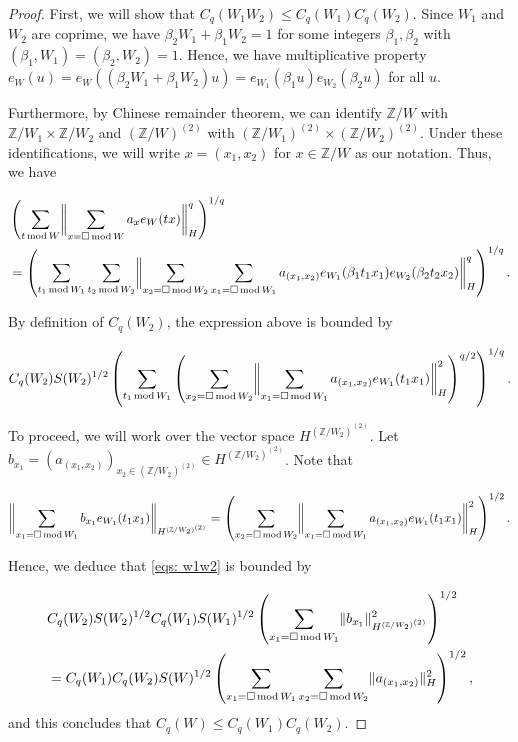 \documentclass[11pt]{amsart}
\theoremstyle{plain} %
\theoremstyle{remark}
\numberwithin{equation}{section}
\newcommand{\Z}{\mathbb{Z}}
\DeclarePairedDelimiter\norm{\lVert}{\rVert}
\newcommand{\sqw}[1]{\sum_{#1=\square\,\mathrm{mod}\,W}}
\newcommand{\sqwone}[1]{\sum_{#1=\square\,\mathrm{mod}\,W_1}}
\newcommand{\sqwtwo}[1]{\sum_{#1=\square\,\mathrm{mod}\,W_2}}
\newcommand{\aw}[1]{\sum_{#1\,\mathrm{mod}\,W}}
\newcommand{\awone}[1]{\sum_{#1\,\mathrm{mod}\,W_1}}
\newcommand{\awtwo}[1]{\sum_{#1\,\mathrm{mod}\,W_2}}
\begin{document}
\begin{proof}
    First, we will show that $C_q(W_1W_2)\leq C_q(W_1)C_q(W_2)$. Since $W_1$ and $W_2$ are coprime, we have $\beta_2 W_1+\beta_1 W_2=1$ for some integers $\beta_1,\beta_2$ with $(\beta_1,W_1)=(\beta_2,W_2)=1$. Hence, we have multiplicative property $e_W(u)=e_W((\beta_2 W_1+\beta_1 W_2)u)=e_{W_1}(\beta_1 u)e_{W_2}(\beta_2 u)$ for all $u$. 
    
    Furthermore, by Chinese remainder theorem, we can identify $\Z/W$ with $\Z/W_1\times\Z/W_2$ and $(\Z/W)^{(2)}$ with $(\Z/W_1)^{(2)}\times(\Z/W_2)^{(2)}$. Under these identifications, we will write $x=(x_1,x_2)$ for $x\in \Z/W$ as our notation. Thus, we have

    \begin{align*}
        &\left(\aw{t}\norm[\bigg]{\sqw{x}a_x e_W(tx)}^q_H\right)^{1/q}\\
        &=\left(\awone{t_1}\awtwo{t_2}\norm[\bigg]{\sqwtwo{x_2}\sqwone{x_1}a_{(x_1,x_2)} e_{W_1}(\beta_1 t_1 x_1)e_{W_2}(\beta_2 t_2 x_2)}^q_H\right)^{1/q}.
    \end{align*}

    By definition of $C_q(W_2)$, the expression above is bounded by

    \begin{equation}\label{eqs: w1w2}
        C_q(W_2)S(W_2)^{1/2}\left(\awone{t_1}\left(\sqwtwo{x_2}\norm[\bigg]{\sqwone{x_1}a_{(x_1,x_2)}e_{W_1}(t_1x_1)}^2_H\right)^{q/2}\right)^{1/q}.
    \end{equation}

    To proceed, we will work over the vector space $H^{(\Z/W_2)^{(2)}}$. Let $b_{x_1}=(a_{(x_1,x_2)})_{x_2\in (\Z/W_2)^{(2)}}\in H^{(\Z/W_2)^{(2)}}$. Note that

    \begin{equation*}
        \norm[\bigg]{\sqwone{x_1} b_{x_1}e_{W_1}(t_1x_1)}_{H^{(\Z/W_2)^{(2)}}}=\left(\sqwtwo{x_2}\norm[\bigg]{\sqwone{x_1}a_{(x_1,x_2)}e_{W_1}(t_1x_1)}^2_H\right)^{1/2}.
    \end{equation*}

    Hence, we deduce that \eqref{eqs: w1w2} is bounded by

    \begin{equation*}
        \begin{split}            &C_q(W_2)S(W_2)^{1/2}C_q(W_1)S(W_1)^{1/2}\left(\sqwone{x_1}\norm{b_{x_1}}^2_{H^{(\Z/W_2)^{(2)}}}\right)^{1/2}\\
        &=C_q(W_1)C_q(W_2)S(W)^{1/2}\left(\sqwone{x_1}\sqwtwo{x_2}\norm{a_{(x_1,x_2)}}^2_H\right)^{1/2},
        \end{split}
    \end{equation*}
    and this concludes that $C_q(W)\leq C_q(W_1)C_q(W_2)$.


\end{proof}
\end{document}
